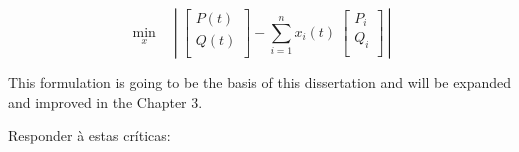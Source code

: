 \begin{equation} \label{classic2}
    \min_{x} \quad \left|\ \begin{bmatrix}
         P(t) \\
         Q(t) \\
        \end{bmatrix} - \sum_{i=1}^{n} x_i(t)\ \begin{bmatrix}
         P_i \\
         Q_i \\
        \end{bmatrix} \ \right|
\end{equation}

This formulation is going to be the basis of this dissertation and will be expanded and improved in the Chapter 3. 


\iffalse
Responder à estas críticas:


